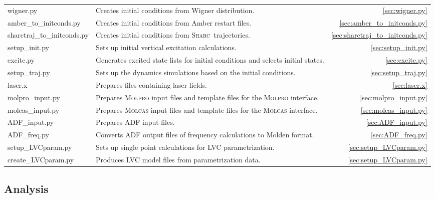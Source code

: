 \documentclass[a4paper,10pt,DIV=15,openany]{scrbook}
\newcommand{\sharc}{\textsc{Sharc}}
\begin{document}
\begin{tabular}{>{\ttfamily}lp{10.5cm}r}
  wigner.py             &Creates initial conditions from Wigner distribution.                   &\ref{sec:wigner.py}\\
  amber\_to\_initconds.py       &Creates initial conditions from Amber restart files.           &\ref{sec:amber_to_initconds.py}\\
  sharctraj\_to\_initconds.py   &Creates initial conditions from \sharc\ trajectories.          &\ref{sec:sharctraj_to_initconds.py}\\
  setup\_init.py        &Sets up initial vertical excitation calculations.                      &\ref{sec:setup_init.py}\\
  excite.py             &Generates excited state lists for initial conditions and selects initial states.                 &\ref{sec:excite.py}\\
  setup\_traj.py        &Sets up the dynamics simulations based on the initial conditions.      &\ref{sec:setup_traj.py}\\
  laser.x               &Prepares files containing laser fields.                                &\ref{sec:laser.x}\\
  molpro\_input.py      &Prepares \textsc{Molpro} input files and template files for the \textsc{Molpro} interface.                  &\ref{sec:molpro_input.py}\\
  molcas\_input.py      &Prepares \textsc{Molcas} input files and template files for the \textsc{Molcas} interface.             &\ref{sec:molcas_input.py}\\
  ADF\_input.py         &Prepares ADF input files.                     &\ref{sec:ADF_input.py}\\
  ADF\_freq.py          &Converts ADF output files of frequency calculations to Molden format.                     &\ref{sec:ADF_freq.py}\\
  setup\_LVCparam.py          &Sets up single point calculations for LVC parametrization.             &\ref{sec:setup_LVCparam.py}\\
  create\_LVCparam.py          &Produces LVC model files from parametrization data.             &\ref{sec:setup_LVCparam.py}\\
\end{tabular}

\subsection{Analysis}
\end{document}
